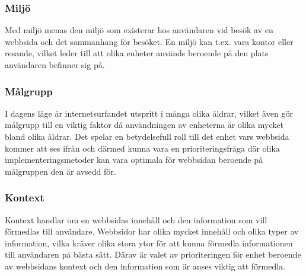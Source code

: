 \documentclass[11pt]{article}
\begin{document}
\subsubsection{Miljö}
Med miljö menas den miljö som existerar hos användaren vid besök av en webbsida och det sammanhang för besöket. En miljö kan t.ex. vara kontor eller resande, vilket leder till att olika enheter används beroende på den plats användaren befinner sig på.

\subsubsection{Målgrupp}
I dagens läge är internetsurfandet utspritt i många olika åldrar, vilket även gör målgrupp till en viktig faktor då användningen av enheterna är olika mycket bland olika åldrar. Det spelar en betydelsefull roll till det enhet vars webbsida kommer att ses ifrån och därmed kunna vara en prioriteringsfråga där olika implementeringsmetoder kan vara optimala för webbsidan beroende på målgruppen den är avsedd för.

\subsubsection{Kontext}
Kontext handlar om en webbsidas innehåll och den information som vill förmedlas till användare. Webbsidor har olika mycket innehåll och olika typer av information, vilka kräver olika stora ytor för att kunna förmedla informationen till användaren på bästa sätt.  Därav är valet av prioriteringen för enhet beroende av webbsidans kontext och den information som är anses viktig att förmedla.
\end{document}
